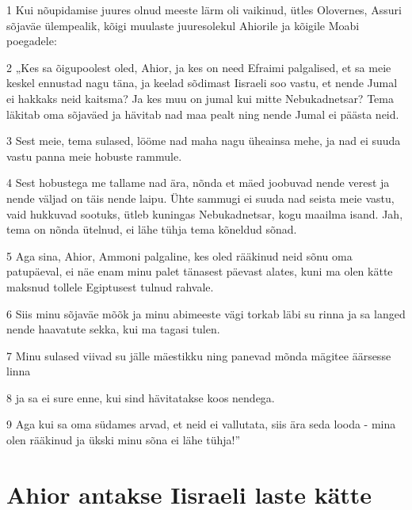 \par 1 Kui nõupidamise juures olnud meeste lärm oli vaikinud, ütles Olovernes, Assuri sõjaväe ülempealik, kõigi muulaste juuresolekul Ahiorile ja kõigile Moabi poegadele:
\par 2 „Kes sa õigupoolest oled, Ahior, ja kes on need Efraimi palgalised, et sa meie keskel ennustad nagu täna, ja keelad sõdimast Iisraeli soo vastu, et nende Jumal ei hakkaks neid kaitsma? Ja kes muu on jumal kui mitte Nebukadnetsar? Tema läkitab oma sõjaväed ja hävitab nad maa pealt ning nende Jumal ei päästa neid.
\par 3 Sest meie, tema sulased, lööme nad maha nagu üheainsa mehe, ja nad ei suuda vastu panna meie hobuste rammule.
\par 4 Sest hobustega me tallame nad ära, nõnda et mäed joobuvad nende verest ja nende väljad on täis nende laipu. Ühte sammugi ei suuda nad seista meie vastu, vaid hukkuvad sootuks, ütleb kuningas Nebukadnetsar, kogu maailma isand. Jah, tema on nõnda ütelnud, ei lähe tühja tema kõneldud sõnad.
\par 5 Aga sina, Ahior, Ammoni palgaline, kes oled rääkinud neid sõnu oma patupäeval, ei näe enam minu palet tänasest päevast alates, kuni ma olen kätte maksnud tollele Egiptusest tulnud rahvale.
\par 6 Siis minu sõjaväe mõõk ja minu abimeeste vägi torkab läbi su rinna ja sa langed nende haavatute sekka, kui ma tagasi tulen.
\par 7 Minu sulased viivad su jälle mäestikku ning panevad mõnda mägitee äärsesse linna
\par 8 ja sa ei sure enne, kui sind hävitatakse koos nendega.
\par 9 Aga kui sa oma südames arvad, et neid ei vallutata, siis ära seda looda - mina olen rääkinud ja ükski minu sõna ei lähe tühja!”

\section*{Ahior antakse Iisraeli laste kätte}

